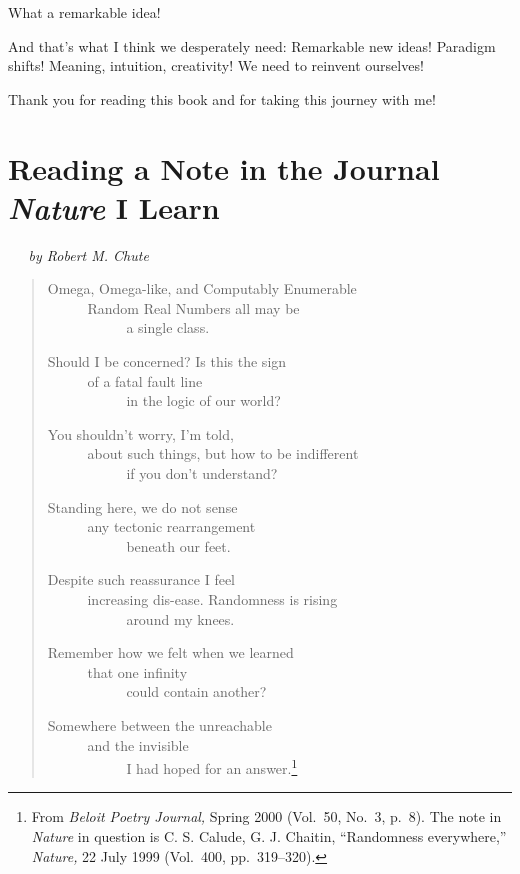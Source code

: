 \documentclass[12pt]{book}
\begin{document}
What a remarkable idea!
 
And that's what I think we desperately need: Remarkable new ideas!
Paradigm shifts!
Meaning, intuition, creativity!
We need to reinvent ourselves! 
 
Thank you for reading this book and for taking this journey with me!

\chapter*{Reading a Note in the Journal \emph{Nature} I Learn}

\emph{
$\;\;\;\;$
by Robert M. Chute 
}

\begin{verse}
Omega, Omega-like, and Computably Enumerable\\
$\;\;\;\;\;\;\;\;\;$
Random Real Numbers all may be\\
$\;\;\;\;\;\;\;\;\;\;\;\;\;\;\;\;\;\;\;$ 
a single class.

Should I be concerned? Is this the sign\\
$\;\;\;\;\;\;\;\;\;$
of a fatal fault line\\
$\;\;\;\;\;\;\;\;\;\;\;\;\;\;\;\;\;\;\;$
in the logic of our world?

You shouldn't worry, I'm told,\\
$\;\;\;\;\;\;\;\;\;$
about such things, but how to be indifferent\\
$\;\;\;\;\;\;\;\;\;\;\;\;\;\;\;\;\;\;\;$
if you don't understand?
 
Standing here, we do not sense\\
$\;\;\;\;\;\;\;\;\;$
any tectonic rearrangement\\
$\;\;\;\;\;\;\;\;\;\;\;\;\;\;\;\;\;\;\;$
beneath our feet.
 
Despite such reassurance I feel\\
$\;\;\;\;\;\;\;\;\;$
increasing dis-ease. Randomness is rising\\
$\;\;\;\;\;\;\;\;\;\;\;\;\;\;\;\;\;\;\;$ 
around my knees.
  
Remember how we felt when we learned\\
$\;\;\;\;\;\;\;\;\;$
that one infinity\\
$\;\;\;\;\;\;\;\;\;\;\;\;\;\;\;\;\;\;\;$
could contain another?
 
Somewhere between the unreachable\\
$\;\;\;\;\;\;\;\;\;$
and the invisible\\
$\;\;\;\;\;\;\;\;\;\;\;\;\;\;\;\;\;\;\;$
I had hoped for an answer.\footnote
{From \emph{Beloit Poetry Journal,} Spring 2000 
(Vol.\ 50, No.\ 3, p.\ 8).
The note in \emph{Nature} in question is C. S. Calude, G. J. Chaitin,
``Randomness everywhere,'' \emph{Nature,} 22 July 1999 (Vol.\ 400, pp.\ 319--320).}
\end{verse}
\end{document}
